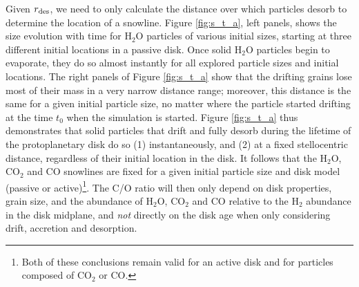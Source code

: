 \documentclass[apj]{emulateapj}
\newcommand{\emgr}[1]{\emph{ \color{gray} #1}}
\begin{document}
Given $r_{\rm des}$, we need to only calculate the distance over which particles desorb to determine the location of a snowline. Figure \ref{fig:s_t_a}, left panels, shows the size evolution with time for H$_2$O particles of various initial sizes, starting at three different initial locations in a passive disk. Once solid H$_2$O particles begin to evaporate, they do so almost instantly for all explored particle sizes and initial locations. %
The right panels of Figure \ref{fig:s_t_a} show that the drifting grains lose most of their mass in a very narrow distance range; moreover, this distance is the same for a given initial particle size, no matter where the particle started drifting at the time $t_0$ when the simulation is started. Figure \ref{fig:s_t_a} thus demonstrates that solid particles that drift and fully desorb during the lifetime of the protoplanetary disk do so (1) instantaneously, and (2) at a fixed stellocentric distance, regardless of their initial location in the disk. 
It follows that the H$_2$O, CO$_2$ and CO snowlines are fixed for a given initial particle size and disk model (passive or active)\footnote{Both of these conclusions remain valid for an active disk and for particles composed of CO$_2$ or CO.}. The C/O ratio will then only depend on disk properties, grain size, and the abundance of H$_2$O, CO$_2$ and CO relative to the H$_2$ abundance in the disk midplane, and {\it not} directly on the disk age when only considering drift, accretion and desorption.  %




\end{document}
